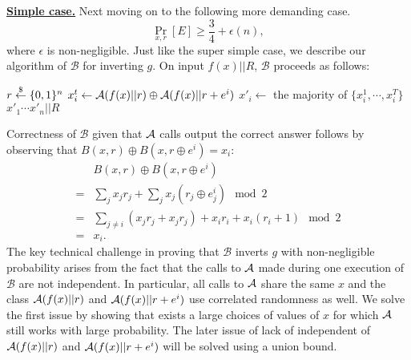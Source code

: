 \bigskip
\noindent\textbf{\underline{Simple case.}}
Next moving on to the following more demanding case.
$$\Pr_{x,r}[E] \geq \frac{3}{4} + \epsilon(n),$$
 where $\epsilon$ is non-negligible.
Just like the super simple case, we describe our algorithm of $\mathcal{B}$ for inverting $g$.
On input $f(x)||R$, $\mathcal{B}$ proceeds as follows:

\medskip
\begin{algorithmic}
		\State $r \stackrel{\$}{\leftarrow} \{ 0, 1 \}^{n}$
    	\State $x_i^t \leftarrow {\mathcal A}(f(x)|| r) \oplus {\mathcal A}(f(x) || r+e^i)$
	\EndFor
	\State $x'_i \gets $ the majority of $\{x_i^1, \cdots, x_i^T\}$
\EndFor
\State \Return $x'_1\cdots x'_n||R$
\end{algorithmic}
Correctness of $\mathcal{B}$ given that ${\mathcal A}$ calls output the correct answer follows by observing that $B(x,r) \oplus B(x, r\oplus e^i) = x_i$:
\begin{align*}
&B(x,r) \oplus B(x, r\oplus e^i)\\
=& \sum_j x_j r_j + \sum_j x_j (r_j \oplus e^i_j) \mod 2\\
=& \sum_{j \not= i} (x_j r_j + x_j r_j) + x_i r_i + x_i (r_i+1) \mod 2\\
=& x_i.
\end{align*}
The key technical challenge in proving that $\mathcal{B}$ inverts $g$ with non-negligible probability arises from the fact that the calls to ${\mathcal A}$ made during one execution of $\mathcal{B}$ are not independent. In particular, all calls to ${\mathcal A}$ share the same $x$ and the class ${\mathcal A}(f(x)|| r)$ and ${\mathcal A}(f(x) || r+e^i)$ use correlated randomness as well. We solve the first issue by showing that exists a large choices of values of $x$ for which ${\mathcal A}$ still works with large probability. The later issue of lack of independent of ${\mathcal A}(f(x)|| r)$ and ${\mathcal A}(f(x) || r+e^i)$ will be solved using a union bound.

